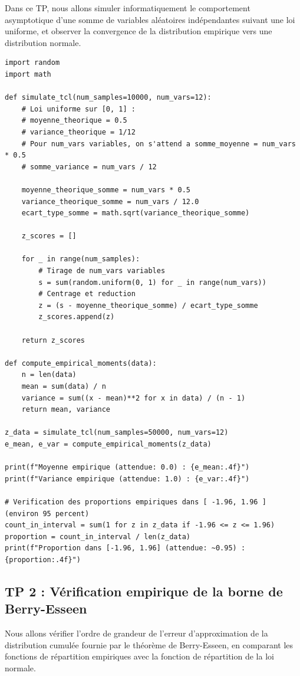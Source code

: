 \documentclass[11pt,a4paper]{article}
\begin{document}
Dans ce TP, nous allons simuler informatiquement le comportement asymptotique d'une somme de variables aléatoires indépendantes suivant une loi uniforme, et observer la convergence de la distribution empirique vers une distribution normale.

\begin{lstlisting}
import random
import math

def simulate_tcl(num_samples=10000, num_vars=12):
    # Loi uniforme sur [0, 1] :
    # moyenne_theorique = 0.5
    # variance_theorique = 1/12
    # Pour num_vars variables, on s'attend a somme_moyenne = num_vars * 0.5
    # somme_variance = num_vars / 12

    moyenne_theorique_somme = num_vars * 0.5
    variance_theorique_somme = num_vars / 12.0
    ecart_type_somme = math.sqrt(variance_theorique_somme)

    z_scores = []

    for _ in range(num_samples):
        # Tirage de num_vars variables
        s = sum(random.uniform(0, 1) for _ in range(num_vars))
        # Centrage et reduction
        z = (s - moyenne_theorique_somme) / ecart_type_somme
        z_scores.append(z)

    return z_scores

def compute_empirical_moments(data):
    n = len(data)
    mean = sum(data) / n
    variance = sum((x - mean)**2 for x in data) / (n - 1)
    return mean, variance

z_data = simulate_tcl(num_samples=50000, num_vars=12)
e_mean, e_var = compute_empirical_moments(z_data)

print(f"Moyenne empirique (attendue: 0.0) : {e_mean:.4f}")
print(f"Variance empirique (attendue: 1.0) : {e_var:.4f}")

# Verification des proportions empiriques dans [ -1.96, 1.96 ] (environ 95 percent)
count_in_interval = sum(1 for z in z_data if -1.96 <= z <= 1.96)
proportion = count_in_interval / len(z_data)
print(f"Proportion dans [-1.96, 1.96] (attendue: ~0.95) : {proportion:.4f}")
\end{lstlisting}


\vspace{1cm}
\subsection*{TP 2 : Vérification empirique de la borne de Berry-Esseen}

Nous allons vérifier l'ordre de grandeur de l'erreur d'approximation de la distribution cumulée fournie par le théorème de Berry-Esseen, en comparant les fonctions de répartition empiriques avec la fonction de répartition de la loi normale.
\end{document}
